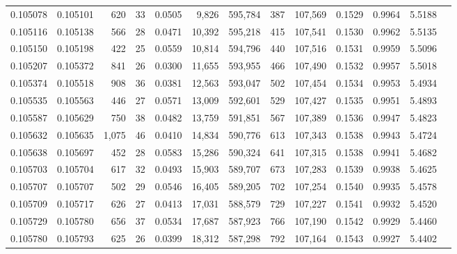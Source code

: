 \begin{tabular}{rrrrrrrrrrrrr}
0.105078 & 0.105101 &   620 &  33 &                                     0.0505 &   9,826 & 595,784 &     387 & 107,569 & 0.1529 & 0.9964 & 5.5188 \\
0.105116 & 0.105138 &   566 &  28 &                                     0.0471 &  10,392 & 595,218 &     415 & 107,541 & 0.1530 & 0.9962 & 5.5135 \\
0.105150 & 0.105198 &   422 &  25 &                                     0.0559 &  10,814 & 594,796 &     440 & 107,516 & 0.1531 & 0.9959 & 5.5096 \\
0.105207 & 0.105372 &   841 &  26 &                                     0.0300 &  11,655 & 593,955 &     466 & 107,490 & 0.1532 & 0.9957 & 5.5018 \\
0.105374 & 0.105518 &   908 &  36 &                                     0.0381 &  12,563 & 593,047 &     502 & 107,454 & 0.1534 & 0.9953 & 5.4934 \\
0.105535 & 0.105563 &   446 &  27 &                                     0.0571 &  13,009 & 592,601 &     529 & 107,427 & 0.1535 & 0.9951 & 5.4893 \\
0.105587 & 0.105629 &   750 &  38 &                                     0.0482 &  13,759 & 591,851 &     567 & 107,389 & 0.1536 & 0.9947 & 5.4823 \\
0.105632 & 0.105635 & 1,075 &  46 &                                     0.0410 &  14,834 & 590,776 &     613 & 107,343 & 0.1538 & 0.9943 & 5.4724 \\
0.105638 & 0.105697 &   452 &  28 &                                     0.0583 &  15,286 & 590,324 &     641 & 107,315 & 0.1538 & 0.9941 & 5.4682 \\
0.105703 & 0.105704 &   617 &  32 &                                     0.0493 &  15,903 & 589,707 &     673 & 107,283 & 0.1539 & 0.9938 & 5.4625 \\
0.105707 & 0.105707 &   502 &  29 &                                     0.0546 &  16,405 & 589,205 &     702 & 107,254 & 0.1540 & 0.9935 & 5.4578 \\
0.105709 & 0.105717 &   626 &  27 &                                     0.0413 &  17,031 & 588,579 &     729 & 107,227 & 0.1541 & 0.9932 & 5.4520 \\
0.105729 & 0.105780 &   656 &  37 &                                     0.0534 &  17,687 & 587,923 &     766 & 107,190 & 0.1542 & 0.9929 & 5.4460 \\
0.105780 & 0.105793 &   625 &  26 &                                     0.0399 &  18,312 & 587,298 &     792 & 107,164 & 0.1543 & 0.9927 & 5.4402 \\

\end{tabular}
